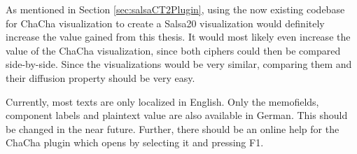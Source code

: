 \begin{description}[style=nextline]
As mentioned in Section \ref{sec:salsaCT2Plugin}, using the now existing codebase for ChaCha visualization to create a Salsa20 visualization would definitely increase the value gained from this thesis. It would most likely even increase the value of the ChaCha visualization, since both ciphers could then be compared side-by-side. Since the visualizations would be very similar, comparing them and their diffusion property should be very easy.

\item[Localization and online help]

Currently, most texts are only localized in English. Only the memofields, component labels and plaintext value are also available in German. This should be changed in the near future. Further, there should be an online help for the ChaCha plugin which opens by selecting it and pressing F1.

\end{description}

